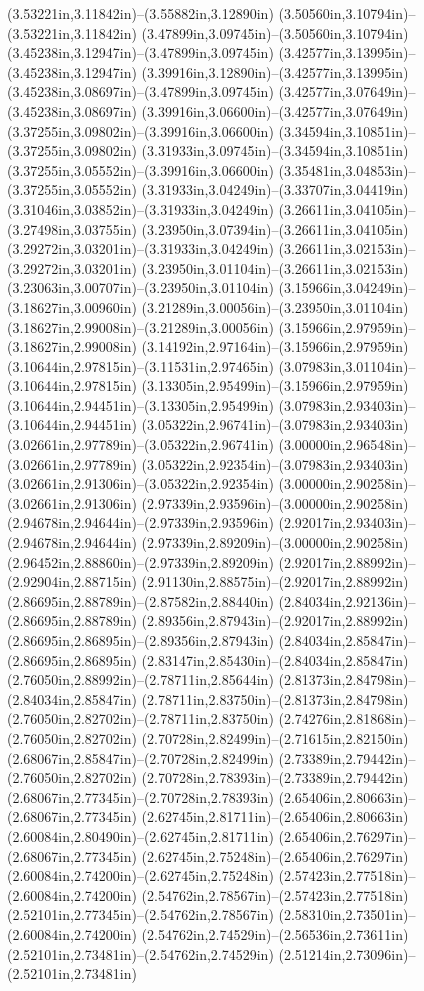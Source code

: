 (3.53221in,3.11842in)--(3.55882in,3.12890in) (3.50560in,3.10794in)--(3.53221in,3.11842in) (3.47899in,3.09745in)--(3.50560in,3.10794in) (3.45238in,3.12947in)--(3.47899in,3.09745in) (3.42577in,3.13995in)--(3.45238in,3.12947in) (3.39916in,3.12890in)--(3.42577in,3.13995in) (3.45238in,3.08697in)--(3.47899in,3.09745in) (3.42577in,3.07649in)--(3.45238in,3.08697in) (3.39916in,3.06600in)--(3.42577in,3.07649in) (3.37255in,3.09802in)--(3.39916in,3.06600in) (3.34594in,3.10851in)--(3.37255in,3.09802in) (3.31933in,3.09745in)--(3.34594in,3.10851in) (3.37255in,3.05552in)--(3.39916in,3.06600in) (3.35481in,3.04853in)--(3.37255in,3.05552in) (3.31933in,3.04249in)--(3.33707in,3.04419in) (3.31046in,3.03852in)--(3.31933in,3.04249in) (3.26611in,3.04105in)--(3.27498in,3.03755in) (3.23950in,3.07394in)--(3.26611in,3.04105in) (3.29272in,3.03201in)--(3.31933in,3.04249in) (3.26611in,3.02153in)--(3.29272in,3.03201in) (3.23950in,3.01104in)--(3.26611in,3.02153in) (3.23063in,3.00707in)--(3.23950in,3.01104in) (3.15966in,3.04249in)--(3.18627in,3.00960in) (3.21289in,3.00056in)--(3.23950in,3.01104in) (3.18627in,2.99008in)--(3.21289in,3.00056in) (3.15966in,2.97959in)--(3.18627in,2.99008in) (3.14192in,2.97164in)--(3.15966in,2.97959in) (3.10644in,2.97815in)--(3.11531in,2.97465in) (3.07983in,3.01104in)--(3.10644in,2.97815in) (3.13305in,2.95499in)--(3.15966in,2.97959in) (3.10644in,2.94451in)--(3.13305in,2.95499in) (3.07983in,2.93403in)--(3.10644in,2.94451in) (3.05322in,2.96741in)--(3.07983in,2.93403in) (3.02661in,2.97789in)--(3.05322in,2.96741in) (3.00000in,2.96548in)--(3.02661in,2.97789in) (3.05322in,2.92354in)--(3.07983in,2.93403in) (3.02661in,2.91306in)--(3.05322in,2.92354in) (3.00000in,2.90258in)--(3.02661in,2.91306in) (2.97339in,2.93596in)--(3.00000in,2.90258in) (2.94678in,2.94644in)--(2.97339in,2.93596in) (2.92017in,2.93403in)--(2.94678in,2.94644in) (2.97339in,2.89209in)--(3.00000in,2.90258in) (2.96452in,2.88860in)--(2.97339in,2.89209in) (2.92017in,2.88992in)--(2.92904in,2.88715in) (2.91130in,2.88575in)--(2.92017in,2.88992in) (2.86695in,2.88789in)--(2.87582in,2.88440in) (2.84034in,2.92136in)--(2.86695in,2.88789in) (2.89356in,2.87943in)--(2.92017in,2.88992in) (2.86695in,2.86895in)--(2.89356in,2.87943in) (2.84034in,2.85847in)--(2.86695in,2.86895in) (2.83147in,2.85430in)--(2.84034in,2.85847in) (2.76050in,2.88992in)--(2.78711in,2.85644in) (2.81373in,2.84798in)--(2.84034in,2.85847in) (2.78711in,2.83750in)--(2.81373in,2.84798in) (2.76050in,2.82702in)--(2.78711in,2.83750in) (2.74276in,2.81868in)--(2.76050in,2.82702in) (2.70728in,2.82499in)--(2.71615in,2.82150in) (2.68067in,2.85847in)--(2.70728in,2.82499in) (2.73389in,2.79442in)--(2.76050in,2.82702in) (2.70728in,2.78393in)--(2.73389in,2.79442in) (2.68067in,2.77345in)--(2.70728in,2.78393in) (2.65406in,2.80663in)--(2.68067in,2.77345in) (2.62745in,2.81711in)--(2.65406in,2.80663in) (2.60084in,2.80490in)--(2.62745in,2.81711in) (2.65406in,2.76297in)--(2.68067in,2.77345in) (2.62745in,2.75248in)--(2.65406in,2.76297in) (2.60084in,2.74200in)--(2.62745in,2.75248in) (2.57423in,2.77518in)--(2.60084in,2.74200in) (2.54762in,2.78567in)--(2.57423in,2.77518in) (2.52101in,2.77345in)--(2.54762in,2.78567in) (2.58310in,2.73501in)--(2.60084in,2.74200in) (2.54762in,2.74529in)--(2.56536in,2.73611in) (2.52101in,2.73481in)--(2.54762in,2.74529in) (2.51214in,2.73096in)--(2.52101in,2.73481in) 